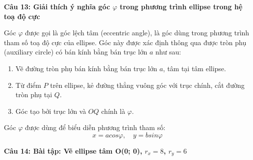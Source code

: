 \textbf{Câu 13: Giải thích ý nghĩa góc $\varphi$ trong phương trình ellipse trong hệ toạ độ cực}

Góc $\varphi$ được gọi là góc lệch tâm (eccentric angle), là góc dùng trong phương trình tham số toạ độ cực của ellipse. Góc này được xác định thông qua được tròn phụ (auxiliary circle) có bán kính bằng bán trục lớn $a$ như sau:

\begin{enumerate}
	\item Vẽ đường tròn phụ bán kính bằng bán trục lớn $a$, tâm tại tâm ellipse.
	
	\item Từ điểm $P$ trên ellipse, kẻ đường thẳng vuông góc với trục chính, cắt đường tròn phụ tại $Q$.
	
	\item Góc tạo bởi trục lớn và $OQ$ chính là $\varphi$.
\end{enumerate}

Góc $\varphi$ được dùng để biểu diễn phương trình tham số:
\[
	x = a cos \varphi, \quad y = b sin \varphi
\]

\textbf{Câu 14: Bài tập: Vẽ ellipse tâm O(0; 0), $r_x = 8$, $r_y = 6$}

